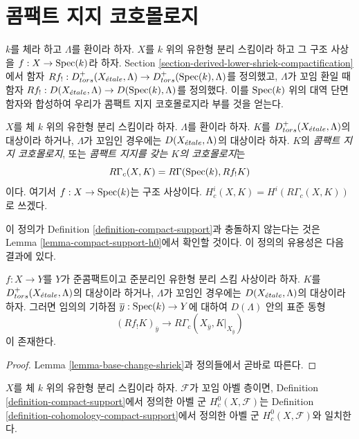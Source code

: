 \section{콤팩트 지지 코호몰로지}
\label{section-compactly-supported-cohomology}

\noindent
$k$를 체라 하고 $\Lambda$를 환이라 하자.
$X$를 $k$ 위의 유한형 분리 스킴이라 하고 그 구조 사상을
$f : X \to \mathop{\mathrm{Spec}}(k)$라 하자. Section
\ref{section-derived-lower-shriek-compactification}에서 함자
$Rf_! : D^+_{tors}(X_{\acute{e}tale}, \Lambda) \to D^+_{tors}(\mathop{\mathrm{Spec}}(k), \Lambda)$를
정의했고, $\Lambda$가 꼬임 환일 때 함자
$Rf_! : D(X_{\acute{e}tale}, \Lambda) \to D(\mathop{\mathrm{Spec}}(k), \Lambda)$를 정의했다.
이를 $\mathop{\mathrm{Spec}}(k)$ 위의 대역 단면 함자와 합성하여 우리가
콤팩트 지지 코호몰로지라 부를 것을 얻는다.

\begin{definition}
\label{definition-cohomology-compact-support}
$X$를 체 $k$ 위의 유한형 분리 스킴이라 하자.
$\Lambda$를 환이라 하자. $K$를
$D^+_{tors}(X_{\acute{e}tale}, \Lambda)$의 대상이라 하거나,
$\Lambda$가 꼬임인 경우에는 $D(X_{\acute{e}tale}, \Lambda)$의 대상이라 하자.
$K$의 {\it 콤팩트 지지 코호몰로지}, 또는
{\it 콤팩트 지지를 갖는 $K$의 코호몰로지}는
$$
R\Gamma_c(X, K) = R\Gamma(\mathop{\mathrm{Spec}}(k), Rf_!K)
$$
이다. 여기서 $f : X \to \mathop{\mathrm{Spec}}(k)$는 구조 사상이다.
$H^i_c(X, K) = H^i(R\Gamma_c(X, K))$로 쓰겠다.
\end{definition}

\noindent
이 정의가 Definition \ref{definition-compact-support}과 충돌하지
않는다는 것은 Lemma \ref{lemma-compact-support-h0}에서 확인할 것이다.
이 정의의 유용성은 다음 결과에 있다.

\begin{lemma}
\label{lemma-stalk-R-f-shriek}
$f : X \to Y$를 $Y$가 준콤팩트이고 준분리인 유한형 분리 스킴
사상이라 하자. $K$를 $D^+_{tors}(X_{\acute{e}tale}, \Lambda)$의 대상이라
하거나, $\Lambda$가 꼬임인 경우에는 $D(X_{\acute{e}tale}, \Lambda)$의
대상이라 하자. 그러면 임의의 기하점
$\overline{y} : \mathop{\mathrm{Spec}}(k) \to Y$에 대하여 $D(\Lambda)$ 안의 표준 동형
$$
(Rf_!K)_{\overline{y}}
\longrightarrow
R\Gamma_c(X_{\overline{y}}, K|_{X_{\overline{y}}})
$$
이 존재한다.
\end{lemma}

\begin{proof}
Lemma \ref{lemma-base-change-shriek}과 정의들에서 곧바로 따른다.
\end{proof}

\begin{lemma}
\label{lemma-compact-support-h0}
$X$를 체 $k$ 위의 유한형 분리 스킴이라 하자.
$\mathcal{F}$가 꼬임 아벨 층이면, Definition
\ref{definition-compact-support}에서 정의한 아벨 군
$H^0_c(X, \mathcal{F})$는 Definition
\ref{definition-cohomology-compact-support}에서 정의한 아벨 군
$H^0_c(X, \mathcal{F})$와 일치한다.
\end{lemma}

